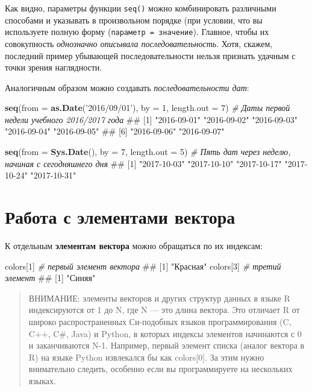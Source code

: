 \documentclass[]{book}
\newenvironment{Shaded}{\begin{snugshade}}{\end{snugshade}}
\newcommand{\KeywordTok}[1]{\textcolor[rgb]{0.13,0.29,0.53}{\textbf{#1}}}
\newcommand{\DataTypeTok}[1]{\textcolor[rgb]{0.13,0.29,0.53}{#1}}
\newcommand{\DecValTok}[1]{\textcolor[rgb]{0.00,0.00,0.81}{#1}}
\newcommand{\StringTok}[1]{\textcolor[rgb]{0.31,0.60,0.02}{#1}}
\newcommand{\CommentTok}[1]{\textcolor[rgb]{0.56,0.35,0.01}{\textit{#1}}}
\newcommand{\NormalTok}[1]{#1}
\begin{document}
Как видно, параметры функции \texttt{seq()} можно комбинировать
различными способами и указывать в произвольном порядке (при условии,
что вы используете полную форму (\texttt{параметр\ =\ значение}).
Главное, чтобы их совокупность \emph{однозначно описывала
последовательность}. Хотя, скажем, последний пример убывающей
последовательности нельзя признать удачным с точки зрения наглядности.

Аналогичным образом можно создавать \emph{последовательности дат}:

\begin{Shaded}
\begin{Highlighting}[]
\KeywordTok{seq}\NormalTok{(}\DataTypeTok{from =} \KeywordTok{as.Date}\NormalTok{(}\StringTok{'2016/09/01'}\NormalTok{), }\DataTypeTok{by =} \DecValTok{1}\NormalTok{, }\DataTypeTok{length.out =} \DecValTok{7}\NormalTok{) }\CommentTok{# Даты первой недели учебного 2016/2017 года}
\NormalTok{## [1] "2016-09-01" "2016-09-02" "2016-09-03" "2016-09-04" "2016-09-05"}
\NormalTok{## [6] "2016-09-06" "2016-09-07"}

\KeywordTok{seq}\NormalTok{(}\DataTypeTok{from =} \KeywordTok{Sys.Date}\NormalTok{(), }\DataTypeTok{by =} \DecValTok{7}\NormalTok{, }\DataTypeTok{length.out =} \DecValTok{5}\NormalTok{) }\CommentTok{# Пять дат через неделю, начиная с сегодняшнего дня}
\NormalTok{## [1] "2017-10-03" "2017-10-10" "2017-10-17" "2017-10-24" "2017-10-31"}
\end{Highlighting}
\end{Shaded}

\section{Работа с элементами вектора}\label{vector_elements}

К отдельным \textbf{элементам вектора} можно обращаться по их индексам:

\begin{Shaded}
\begin{Highlighting}[]
\NormalTok{colors[}\DecValTok{1}\NormalTok{] }\CommentTok{# первый элемент вектора}
\NormalTok{## [1] "Красная"}
\NormalTok{colors[}\DecValTok{3}\NormalTok{] }\CommentTok{# третий элемент}
\NormalTok{## [1] "Синяя"}
\end{Highlighting}
\end{Shaded}

\begin{quote}
ВНИМАНИЕ: элементы векторов и других структур данных в языке R
индексируются от 1 до N, где N --- это длина вектора. Это отличает R от
широко распространенных Си-подобных языков программирования (C, C++,
C\#, Java) и Python, в которых индексы элементов начинаются с 0 и
заканчиваются N-1. Например, первый элемент списка (аналог вектора в R)
на языке Python извлекался бы как colors{[}0{]}. За этим нужно
внимательно следить, особенно если вы программируете на нескольких
языках.
\end{quote}
\end{document}
